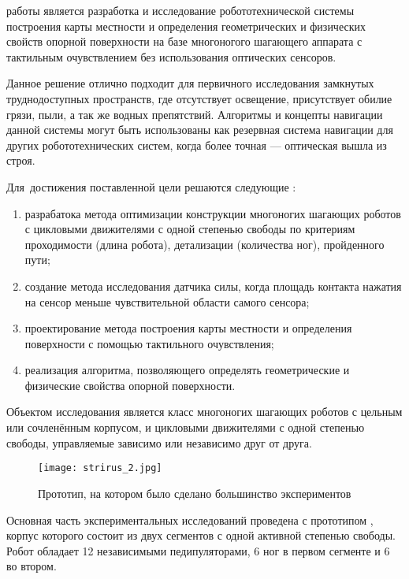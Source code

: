 {\aim} работы является разработка и исследование робототехнической системы построения карты местности и определения геометрических и физических свойств опорной поверхности на базе многоногого шагающего аппарата с тактильным очувствлением без использования оптических сенсоров.

Данное решение отлично подходит для первичного исследования замкнутых труднодоступных пространств, где отсутствует освещение, присутствует обилие грязи, пыли, а так же водных препятствий. Алгоритмы и концепты навигации данной системы могут быть использованы как резервная система навигации для других робототехнических систем, когда более точная --- оптическая вышла из строя.

Для~достижения поставленной цели решаются следующие {\tasks}:
\begin{enumerate}[beginpenalty=10000] %
    \item разрабатока метода оптимизации конструкции многоногих шагающих роботов с цикловыми движителями с одной степенью свободы по критериям проходимости (длина робота), детализации (количества ног), пройденного пути;
    \item создание метода исследования датчика силы, когда площадь контакта нажатия на сенсор меньше чувствительной области самого сенсора;
  \item  проектирование метода построения карты местности и определения поверхности с помощью тактильного очувствления;
  \item реализация алгоритма, позволяющего определять геометрические и физические свойства опорной поверхности.
\end{enumerate}

{\researchobj}
Объектом исследования является класс многоногих шагающих роботов с цельным или сочленённым корпусом, и цикловыми движителями с одной степенью свободы, управляемые зависимо или независимо друг от друга.

\begin{figure}[H]
  \centering\texttt{[image: strirus\_2.jpg]}
  \caption{Прототип, на котором было сделано большинство экспериментов}
  \label{fig:strirus_2.jpgg}
\end{figure}

Основная часть экспериментальных исследований проведена с прототипом , корпус которого состоит из двух сегментов с одной активной степенью свободы. Робот обладает 12 независимыми педипуляторами, 6 ног в первом сегменте и 6 во втором.

